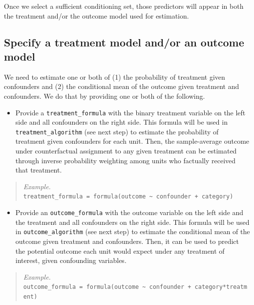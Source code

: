 \documentclass[
]{article}
\providecommand{\tightlist}{%
  \setlength{\itemsep}{0pt}\setlength{\parskip}{0pt}}
\begin{document}
Once we select a sufficient conditioning set, those predictors will appear in both the treatment and/or the outcome model used for estimation.

\hypertarget{specify-a-treatment-model-andor-an-outcome-model}{%
\subsection{Specify a treatment model and/or an outcome model}\label{specify-a-treatment-model-andor-an-outcome-model}}

We need to estimate one or both of (1) the probability of treatment given confounders and (2) the conditional mean of the outcome given treatment and confounders. We do that by providing one or both of the following.

\begin{itemize}
\tightlist
\item
  Provide a \texttt{treatment\_formula} with the binary treatment variable on the left side and all confounders on the right side. This formula will be used in \texttt{treatment\_algorithm} (see next step) to estimate the probability of treatment given confounders for each unit. Then, the sample-average outcome under counterfactual assignment to any given treatment can be estimated through inverse probability weighting among units who factually received that treatment.
\end{itemize}

\begin{quote}
\emph{Example.}\\
\texttt{treatment\_formula\ =\ formula(outcome\ \textasciitilde{}\ confounder\ +\ category)}
\end{quote}

\begin{itemize}
\tightlist
\item
  Provide an \texttt{outcome\_formula} with the outcome variable on the left side and the treatment and all confounders on the right side. This formula will be used in \texttt{outcome\_algorithm} (see next step) to estimate the conditional mean of the outcome given treatment and confounders. Then, it can be used to predict the potential outcome each unit would expect under any treatment of interest, given confounding variables.
\end{itemize}

\begin{quote}
\emph{Example.}\\
\texttt{outcome\_formula\ =\ formula(outcome\ \textasciitilde{}\ confounder\ +\ category*treatment)}
\end{quote}
\end{document}
